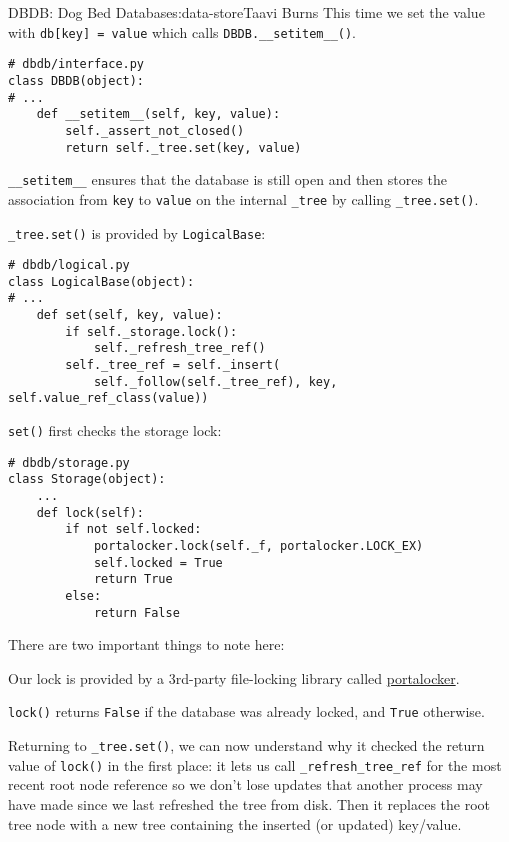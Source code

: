 \begin{aosachapter}{DBDB: Dog Bed Database}{s:data-store}{Taavi Burns}
This time we set the value with \texttt{db{[}key{]} = value} which calls
\texttt{DBDB.\_\_setitem\_\_()}.

\begin{verbatim}
# dbdb/interface.py
class DBDB(object):
# ...
    def __setitem__(self, key, value):
        self._assert_not_closed()
        return self._tree.set(key, value)
\end{verbatim}

\texttt{\_\_setitem\_\_} ensures that the database is still open and
then stores the association from \texttt{key} to \texttt{value} on the
internal \texttt{\_tree} by calling \texttt{\_tree.set()}.

\texttt{\_tree.set()} is provided by \texttt{LogicalBase}:

\begin{verbatim}
# dbdb/logical.py
class LogicalBase(object):
# ...
    def set(self, key, value):
        if self._storage.lock():
            self._refresh_tree_ref()
        self._tree_ref = self._insert(
            self._follow(self._tree_ref), key, self.value_ref_class(value))
\end{verbatim}

\texttt{set()} first checks the storage lock:

\begin{verbatim}
# dbdb/storage.py
class Storage(object):
    ...
    def lock(self):
        if not self.locked:
            portalocker.lock(self._f, portalocker.LOCK_EX)
            self.locked = True
            return True
        else:
            return False
\end{verbatim}

There are two important things to note here:

\begin{aosaitemize}

\item
  Our lock is provided by a 3rd-party file-locking library called
  \href{https://pypi.python.org/pypi/portalocker}{portalocker}.
\item
  \texttt{lock()} returns \texttt{False} if the database was already
  locked, and \texttt{True} otherwise.
\end{aosaitemize}

Returning to \texttt{\_tree.set()}, we can now understand why it checked
the return value of \texttt{lock()} in the first place: it lets us call
\texttt{\_refresh\_tree\_ref} for the most recent root node reference so
we don't lose updates that another process may have made since we last
refreshed the tree from disk. Then it replaces the root tree node with a
new tree containing the inserted (or updated) key/value.


\end{aosachapter}
